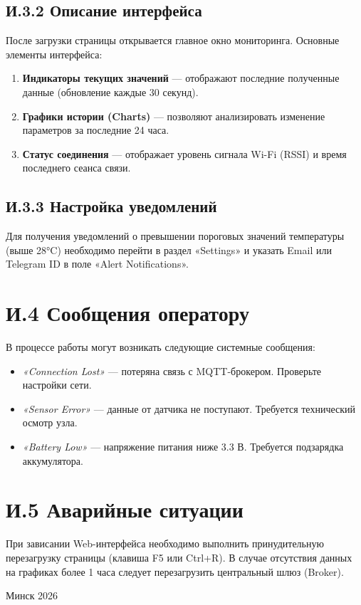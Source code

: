 \subsection*{И.3.2 Описание интерфейса}
После загрузки страницы открывается главное окно мониторинга. Основные элементы интерфейса:
\begin{enumerate}
    \item \textbf{Индикаторы текущих значений} --- отображают последние полученные данные (обновление каждые 30 секунд).
    \item \textbf{Графики истории (Charts)} --- позволяют анализировать изменение параметров за последние 24 часа.
    \item \textbf{Статус соединения} --- отображает уровень сигнала Wi-Fi (RSSI) и время последнего сеанса связи.
\end{enumerate}



\subsection*{И.3.3 Настройка уведомлений}
Для получения уведомлений о превышении пороговых значений температуры (выше 28°C) необходимо перейти в раздел «Settings» и указать Email или Telegram ID в поле «Alert Notifications».

\section*{И.4 Сообщения оператору}

В процессе работы могут возникать следующие системные сообщения:
\begin{itemize}
    \item \textit{«Connection Lost»} --- потеряна связь с MQTT-брокером. Проверьте настройки сети.
    \item \textit{«Sensor Error»} --- данные от датчика не поступают. Требуется технический осмотр узла.
    \item \textit{«Battery Low»} --- напряжение питания ниже 3.3 В. Требуется подзарядка аккумулятора.
\end{itemize}

\section*{И.5 Аварийные ситуации}

При зависании Web-интерфейса необходимо выполнить принудительную перезагрузку страницы (клавиша F5 или Ctrl+R). В случае отсутствия данных на графиках более 1 часа следует перезагрузить центральный шлюз (Broker).

\vfill
\begin{center}
    Минск 2026
\end{center}
\newpage